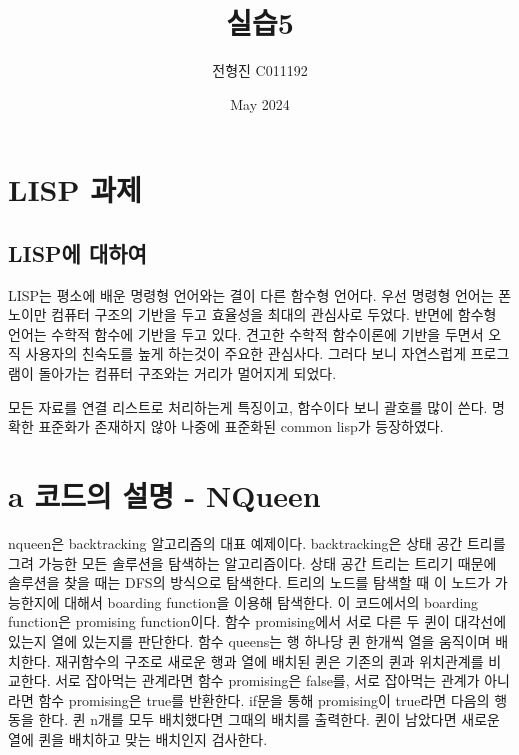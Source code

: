 \documentclass{article}
\title{실습5}
\author{전형진 C011192}
\date{May 2024}
\begin{document}
\maketitle

\section{LISP 과제}

\subsection{LISP에 대하여}
LISP는 평소에 배운 명령형 언어와는 결이 다른 함수형 언어다. 우선 명령형 언어는 폰 노이만 컴퓨터 구조의 기반을 두고 효율성을 최대의 관심사로 두었다. 반면에 함수형 언어는 수학적 함수에 기반을 두고 있다. 견고한 수학적 함수이론에 기반을 두면서 오직 사용자의 친숙도를 높게 하는것이 주요한 관심사다. 그러다 보니 자연스럽게 프로그램이 돌아가는 컴퓨터 구조와는 거리가 멀어지게 되었다.

모든 자료를 연결 리스트로 처리하는게 특징이고, 함수이다 보니 괄호를 많이 쓴다. 명확한 표준화가 존재하지 않아 나중에 표준화된 common lisp가 등장하였다.

\section{a 코드의 설명 - NQueen}
nqueen은 backtracking 알고리즘의 대표 예제이다. backtracking은 상태 공간 트리를 그려 가능한 모든 솔루션을 탐색하는 알고리즘이다. 상태 공간 트리는 트리기 때문에 솔루션을 찾을 때는 DFS의 방식으로 탐색한다. 트리의 노드를 탐색할 때 이 노드가 가능한지에 대해서
boarding function을 이용해 탐색한다. 이 코드에서의 boarding function은 promising function이다. 함수 promising에서 서로 다른 두 퀸이 대각선에 있는지 열에 있는지를 판단한다. 함수 queens는 행 하나당 퀸 한개씩 열을 움직이며 배치한다. 재귀함수의 구조로 새로운 행과 열에 배치된 퀸은 기존의 퀸과 위치관계를 비교한다. 서로 잡아먹는 관계라면 함수 promising은 false를, 서로 잡아먹는 관계가 아니라면 함수 promising은 true를 반환한다. if문을 통해 promising이 true라면 다음의 행동을 한다. 퀸 n개를 모두 배치했다면 그때의 배치를 출력한다. 퀸이 남았다면 새로운 열에 퀸을 배치하고 맞는 배치인지 검사한다.

\newpage
\end{document}
